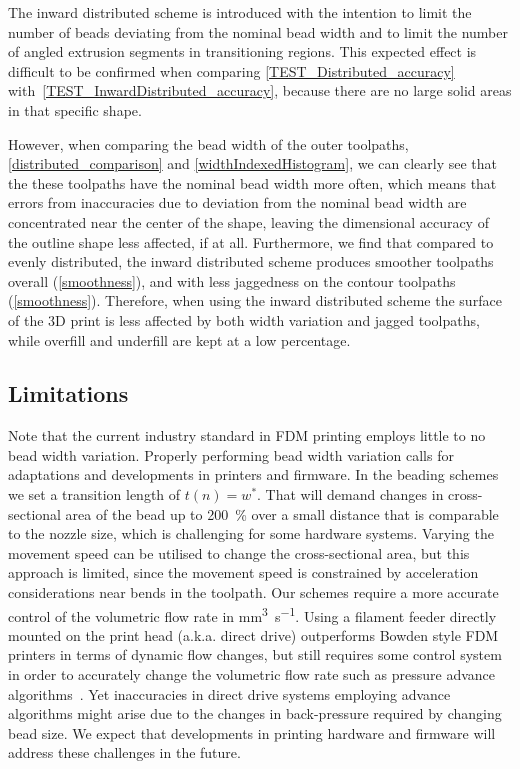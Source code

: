The inward distributed scheme is introduced with the intention to limit the number of beads deviating from the nominal bead width and to limit the number of angled extrusion segments in transitioning regions.
This expected effect is difficult to be confirmed when comparing \cref{TEST_Distributed_accuracy} with~\ref{TEST_InwardDistributed_accuracy}, because there are no large solid areas in that specific shape.

However, when comparing the bead width of the outer toolpaths, \cref{distributed_comparison} and  \cref{widthIndexedHistogram}, we can clearly see that the these toolpaths have the nominal bead width more often, which means that errors from inaccuracies due to deviation from the nominal bead width are concentrated near the center of the shape, leaving the dimensional accuracy of the outline shape less affected, if at all. 
Furthermore, we find that compared to evenly distributed, the inward distributed scheme produces smoother toolpaths overall (\cref{smoothness}), and with less jaggedness on the contour toolpaths (\cref{smoothness}). 
Therefore, when using the inward distributed scheme the surface of the 3D print is less affected by both width variation and jagged toolpaths, while overfill and underfill are kept at a low percentage.














\subsection{Limitations}
Note that the current industry standard in FDM printing employs little to no bead width variation.
Properly performing bead width variation calls for adaptations and developments in printers and firmware.
In the beading schemes we set a transition length of $t(n) = w^*$.
That will demand changes in cross-sectional area of the bead up to \SI{200}{\percent} over a small distance that is comparable to the nozzle size, which is challenging for some hardware systems.
Varying the movement speed can be utilised to change the cross-sectional area, but this approach is limited, since the movement speed is constrained by acceleration considerations near bends in the toolpath.
Our schemes require a more accurate control of the volumetric flow rate in \si{\milli\meter\cubed\per\second}.
Using a filament feeder directly mounted on the print head (a.k.a. direct drive) outperforms Bowden style FDM printers in terms of dynamic flow changes,
but still requires some control system in order to accurately change the volumetric flow rate such as pressure advance algorithms~\cite{tronvoll2019investigating}.
Yet inaccuracies in direct drive systems employing advance algorithms might arise due to the changes in back-pressure required by changing bead size.
We expect that developments in printing hardware and firmware will address these challenges in the future.


